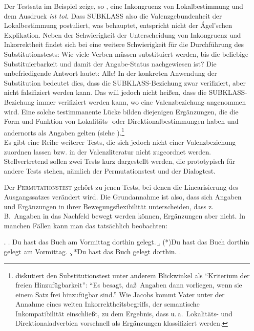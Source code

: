 Der Testsatz im Beispiel zeige, so \citet[188]{Agel:00}, eine Inkongruenz von Lokalbestimmung und dem Ausdruck {\it ist tot}. Dass SUBKLASS also die Valenzgebundenheit der Lokalbestimmung postuliert, was \citet[26]{Jacobs:94} behauptet, entspricht nicht der \'Agel'schen Explikation. Neben der Schwierigkeit der Unterscheidung von Inkongruenz und Inkorrektheit findet sich bei \citet[66f]{Storrer:92} eine weitere Schwierigkeit für die Durchführung des Substitutionstests: Wie viele Verben müssen substituiert werden, bis die beliebige Substituierbarkeit und damit der Angabe-Status nachgewiesen ist? Die unbefriedigende Antwort lautet: Alle! In der konkreten Anwendung der Substitution bedeutet dies, dass die SUBKLASS-Beziehung zwar verifiziert, aber nicht falsifiziert werden kann. Das will jedoch nicht hei\ss en, dass die SUBKLASS-Beziehung immer verifiziert werden kann, wo eine Valenzbeziehung angenommen wird. Eine solche testimmanente Lücke bilden diejenigen Ergänzungen, die die Form und Funktion von Lokalitäts- oder Direktionalbestimmungen haben und andernorts als Angaben gelten (siehe \citealt[360f]{Zifonun:03}).\footnote{\citet[16f]{Vater:81} diskutiert den Substitutionstest unter anderem Blickwinkel als "`Kriterium der freien Hinzufügbarkeit"': "`Es besagt, da\ss\ Angaben dann vorliegen, wenn sie einem Satz frei hinzufügbar sind."' Wie Jacobs kommt Vater unter der Annahme eines weiten Inkorrektheitsbegriffs, der semantische Inkompatibilität einschlie\ss t, zu dem Ergebnis, dass u.\,a.\ Lokalitäts- und Direktionaladverbien vorschnell als Ergänzungen klassifiziert werden.}    \\






Es gibt eine Reihe weiterer Tests, die sich jedoch nicht einer Valenzbeziehung zuordnen lassen bzw. in der Valenzliteratur nicht zugeordnet werden. Stellvertretend sollen zwei Tests kurz dargestellt werden, die prototypisch für andere Tests stehen, nämlich der Permutationstest und der Dialogtest. 

Der \textsc{Permutationstest} gehört zu jenen Tests, bei denen die Linearisierung des Ausgangssatzes verändert wird. Die Grundannahme ist also, dass sich Angaben und Ergänzungen in ihrer Bewegungsflexibilität unterscheiden, dass z.\,B.\ Angaben in das Nachfeld bewegt werden können, Ergänzungen aber nicht. In manchen Fällen kann man das tatsächlich beobachten: 
 
\ex. 
\a. Du hast das Buch am Vormittag dorthin gelegt.
\b. (*)Du hast das Buch dorthin gelegt am Vormittag.\label{ex-storrer-63-b}
\c. *Du hast das Buch gelegt dorthin.\label{ex-storrer-63-c}
\z. \citep[63]{Storrer:92}

